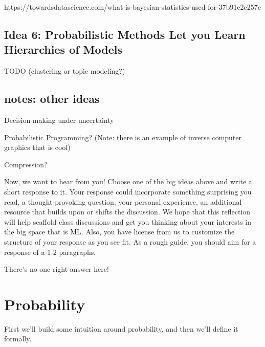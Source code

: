 \documentclass[assignment01_Solutions]{subfiles}
\begin{document}
https://towardsdatascience.com/what-is-bayesian-statistics-used-for-37b91c2c257c

\subsection*{Idea 6: Probabilistic Methods Let you Learn Hierarchies of Models}
TODO (clustering or topic modeling?)


\subsection*{notes: other ideas}
\bi
\item Decision-making under uncertainty
\item \href{https://arxiv.org/pdf/1809.10756.pdf}{Probabilistic Programming?} (Note: there is an example of inverse computer graphics that is cool)
\item Compression?
\ei

\begin{exercise}
Now, we want to hear from you!  
Choose one of the big ideas above and write a short response to it.  Your response could incorporate something surprising you read, a thought-provoking question, your personal experience, an additional resource that builds upon or shifts the discussion.  We hope that this reflection will help scaffold class discussions and get you thinking about your interests in the big space that is ML.  Also, you have license from us to customize the structure of your response as you see fit.  As a rough guide, you should aim for a response of a 1-2 paragraphs.

\begin{boxedsolution}
There's no one right answer here!
\end{boxedsolution}
\end{exercise}

\section{Probability}
First we'll build some intuition around probability, and then we'll define it formally.
\end{document}
